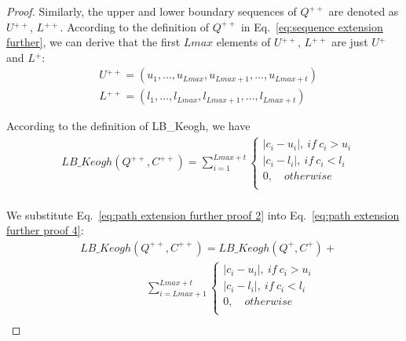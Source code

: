\documentclass[10pt,journal,compsoc]{IEEEtran}
\begin{document}
\begin{proof}
Similarly, the upper and lower boundary sequences of $Q^{++}$ are denoted as $U{^{++}}$, $L{^{++}}$.
According to the definition of $Q^{++}$ in Eq.~\eqref{eq:sequence extension further},
we can derive that the first $Lmax$ elements of $U{^{++}}$, $L{^{++}}$ are just $U{^+}$ and $L{^+}$:
\begin{equation}\label{eq:path extension further proof 3}
\begin{split}
   & U{^{++}} = (u_1,\ldots, u_{Lmax}, u_{Lmax+1}, \ldots, u_{Lmax+t} ) \\
   & L{^{++}} = (l_1,\ldots, l_{Lmax}, l_{Lmax+1}, \ldots, l_{Lmax+t} )
\end{split}
\end{equation}

According to the definition of LB\_Keogh, we have
\begin{equation}\label{eq:path extension further proof 4}
\begin{split}
    & LB\_Keogh(Q^{++},C^{++})= \sum\limits_{i=1}^{Lmax+t}  \left\{ {\begin{array}{l}
 |c_i-u_i|,  \ if \  c_i>u_i \\
 |c_i-l_i|,  \ if \  c_i<l_i \\
  0,  \quad otherwise \\
 \end{array}} \right.  \\
\end{split}
\end{equation}

We substitute Eq.~\eqref{eq:path extension further proof 2} into Eq.~\eqref{eq:path extension further proof 4}:
\begin{equation}\label{eq:path extension further proof 5}
\begin{split}
    & LB\_Keogh(Q^{++},C^{++})= LB\_Keogh(Q^{+},C^{+}) + \\
    & \quad\quad\quad\quad\quad\quad \sum\limits_{i=Lmax+1}^{Lmax+t}  \left\{ {\begin{array}{l}
 |c_i-u_i|,  \ if \  c_i>u_i \\
 |c_i-l_i|,  \ if \  c_i<l_i \\
  0,  \quad otherwise \\
 \end{array}} \right.  \\
\end{split}
\end{equation}


\end{proof}
\end{document}

